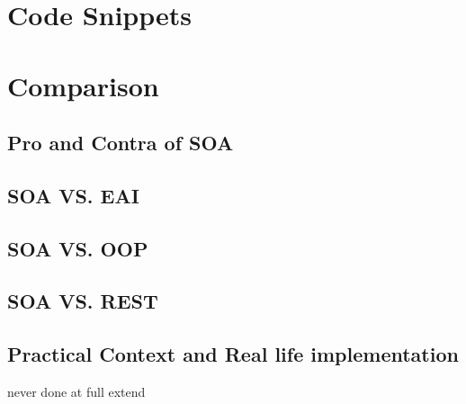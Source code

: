 \documentclass[12pt]{article}
\begin{document}
\section{Code Snippets}
\section{Comparison}
\subsection{Pro and Contra of SOA}
\subsection{SOA VS. EAI}
\subsection{SOA VS. OOP}
\subsection{SOA VS. REST}
\subsection{Practical Context and Real life implementation}
never done at full extend







\listoftables
\listoffigures
\printglossaries
\end{document}
